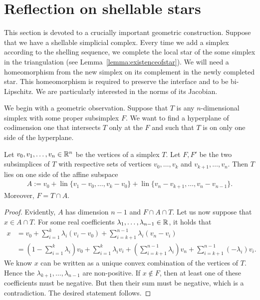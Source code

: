 \documentclass[10pt,letterpaper]{article}
\begin{document}
\section{Reflection on shellable stars}\label{section:extension}

This section is devoted to a crucially important geometric construction. 
Suppose that we have a shellable simplicial complex. 
Every time we add a simplex according to the shelling sequence, 
we complete the local star of the some simplex in the triangulation (see Lemma~\ref{lemma:existenceofstar}).
We will need a homeomorphism from the new simplex on its complement in the newly completed star.
This homeomorphism is required to preserve the interface and to be bi-Lipschitz.
We are particularly interested in the norms of its Jacobian.




We begin with a geometric observation. 
Suppose that $T$ is any $n$-dimensional simplex with some proper subsimplex $F$.
We want to find a hyperplane of codimension one that intersects $T$ only at the $F$ and such that $T$ is on only one side of the hyperplane. 

\begin{lemma}\label{lemma:oppositesubsimplex}
    Let $v_0, v_1, \dots, v_n \in {\mathbb R}^n$ be the vertices of a simplex $T$.
    Let $F, F'$ be the two subsimplices of $T$ with respective sets of vertices $v_0,\dots,v_k$ and $v_{k+1},\dots,v_n$.
    Then $T$ lies on one side of the affine subspace
    \begin{gather*}
        A := v_0 + \operatorname{lin}\{ v_1 - v_0, \dots, v_k - v_0 \} +  \operatorname{lin}\{ v_n - v_{k+1}, \dots, v_n - v_{n-1} \}.
    \end{gather*}
    Moreover, $F = T \cap A$.
\end{lemma}
\begin{proof}
    Evidently, $A$ has dimension $n-1$ and $F \cap A \cap T$.
    Let us now suppose that $x \in A \cap T$.
    For some real coefficients $\lambda_1,\dots,\lambda_{n-1} \in {\mathbb R}$, it holds that 
    \begin{align*}
        x &= 
        v_0 + \sum_{i=1}^{k} \lambda_{i} ( v_i - v_0 ) + \sum_{i=k+1}^{n-1} \lambda_{i} ( v_n - v_i )
        \\&
        = 
        \left( 1 - \sum_{i=1}^{k} \lambda_{i} \right) v_0 
        + 
        \sum_{i=1  }^{k  } \lambda_{i} v_i 
        + 
        \left( \sum_{i=k+1}^{n-1} \lambda_{i} \right) v_n
        + 
        \sum_{i=k+1}^{n-1} (-\lambda_{i}) v_i 
        .
    \end{align*}
    We know $x$ can be written as a unique convex combination of the vertices of $T$.
    Hence the $\lambda_{k+1}, \dots, \lambda_{n-1}$ are non-positive. 
    If $x \notin F$, then at least one of these coefficients must be negative. 
    But then their sum must be negative, which is a contradiction. 
    The desired statement follows.         
\end{proof}
\end{document}
